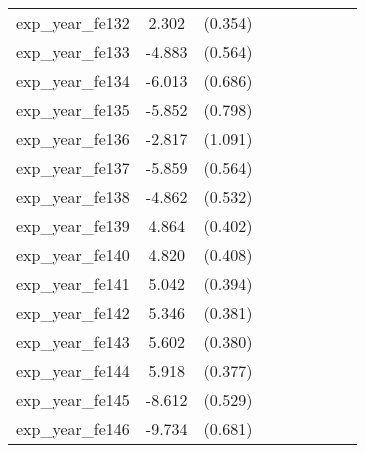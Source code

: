 {\begin{tabular}{l*{4}{cc}}
exp\_year\_fe132&    2.302\sym{***}&  (0.354)&                  &         &                  &         &                  &         \\
exp\_year\_fe133&   -4.883\sym{***}&  (0.564)&                  &         &                  &         &                  &         \\
exp\_year\_fe134&   -6.013\sym{***}&  (0.686)&                  &         &                  &         &                  &         \\
exp\_year\_fe135&   -5.852\sym{***}&  (0.798)&                  &         &                  &         &                  &         \\
exp\_year\_fe136&   -2.817\sym{**} &  (1.091)&                  &         &                  &         &                  &         \\
exp\_year\_fe137&   -5.859\sym{***}&  (0.564)&                  &         &                  &         &                  &         \\
exp\_year\_fe138&   -4.862\sym{***}&  (0.532)&                  &         &                  &         &                  &         \\
exp\_year\_fe139&    4.864\sym{***}&  (0.402)&                  &         &                  &         &                  &         \\
exp\_year\_fe140&    4.820\sym{***}&  (0.408)&                  &         &                  &         &                  &         \\
exp\_year\_fe141&    5.042\sym{***}&  (0.394)&                  &         &                  &         &                  &         \\
exp\_year\_fe142&    5.346\sym{***}&  (0.381)&                  &         &                  &         &                  &         \\
exp\_year\_fe143&    5.602\sym{***}&  (0.380)&                  &         &                  &         &                  &         \\
exp\_year\_fe144&    5.918\sym{***}&  (0.377)&                  &         &                  &         &                  &         \\
exp\_year\_fe145&   -8.612\sym{***}&  (0.529)&                  &         &                  &         &                  &         \\
exp\_year\_fe146&   -9.734\sym{***}&  (0.681)&                  &         &                  &         &                  &         \\

\end{tabular}}
